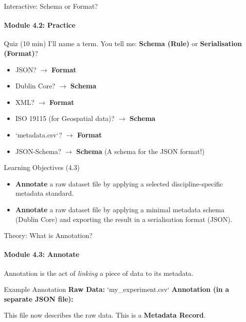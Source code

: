 \begin{frame}{Interactive: Schema or Format?}
    \framesubtitle{Module 4.2: Practice}
    \begin{block}{Quiz (10 min)}
        I'll name a term. You tell me: \textbf{Schema (Rule)} or \textbf{Serialisation (Format)}?
        \pause
        \begin{itemize}
            \item JSON? $\rightarrow$ \textbf{Format}
            \pause
            \item Dublin Core? $\rightarrow$ \textbf{Schema}
            \pause
            \item XML? $\rightarrow$ \textbf{Format}
            \pause
            \item ISO 19115 (for Geospatial data)? $\rightarrow$ \textbf{Schema}
            \pause
            \item `metadata.csv`? $\rightarrow$ \textbf{Format}
            \pause
            \item JSON-Schema? $\rightarrow$ \textbf{Schema} (A schema for the JSON format!)
        \end{itemize}
    \end{block}
\end{frame}

\begin{frame}{Learning Objectives (4.3)}
    \begin{itemize}
        \item \textbf{Annotate} a raw dataset file by applying a selected discipline-specific metadata standard.
        \item \textbf{Annotate} a raw dataset file by applying a minimal metadata schema (Dublin Core) and exporting the result in a serialisation format (JSON).
    \end{itemize}
\end{frame}

\begin{frame}{Theory: What is Annotation?}
    \framesubtitle{Module 4.3: Annotate}
    Annotation is the act of \emph{linking} a piece of data to its metadata.
    
    \begin{block}{Example Annotation}
        \textbf{Raw Data:} `my\_experiment.csv`
        \pause
        \textbf{Annotation (in a separate JSON file):}
    \end{block}
    \pause
    This file now describes the raw data. This is a \textbf{Metadata Record}.
\end{frame}

